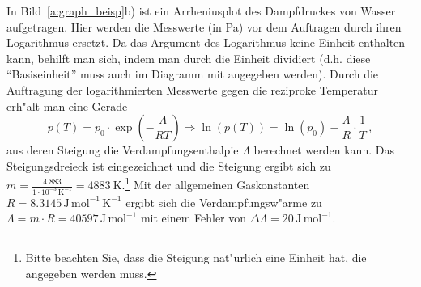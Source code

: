 In Bild~\ref{a:graph_beisp}b) ist ein Arrheniusplot des Dampfdruckes
von Wasser aufgetragen. Hier werden die Messwerte (in Pa) vor dem
Auftragen durch ihren Logarithmus ersetzt. Da das Argument des
Logarithmus keine Einheit enthalten kann, behilft man sich, indem
man durch die Einheit dividiert (d.h. diese "`Basiseinheit"' muss
auch im Diagramm mit angegeben werden). Durch die Auftragung der
logarithmierten Messwerte gegen die reziproke Temperatur erh"alt man
eine Gerade
%
\begin{equation}\label{e:bsp_dampf}
    p(T) = p_0 \cdot \exp\left( - \frac{\Lambda}{RT} \right) \Rightarrow
    \ln\left( p(T) \right) = \ln(p_0) - \frac{\Lambda}{R} \cdot
    \frac{1}{T} \, ,
\end{equation}
%
aus deren Steigung die Verdampfungsenthalpie $\Lambda$ berechnet
werden kann. Das Steigungsdreieck ist eingezeichnet und die Steigung
ergibt sich zu
$m=\frac{\mathrm{4.883}}{\mathrm{1\cdot 10^{-3}\, K^{-1}}}=\mathrm{4883~K}$.\footnote{Bitte
beachten Sie, dass die Steigung nat"urlich eine Einheit hat, die
angegeben werden muss.} Mit der allgemeinen Gaskonstanten
$R=\mathrm{8.3145\,J \, mol^{-1} \, K^{-1}}$ ergibt sich die
Verdampfungsw"arme zu $\Lambda=m \cdot R = \mathrm{40597\,J \,mol^{-1}}$ mit einem Fehler von $\Delta \Lambda = \mathrm{20\,J \,mol^{-1}}$.
